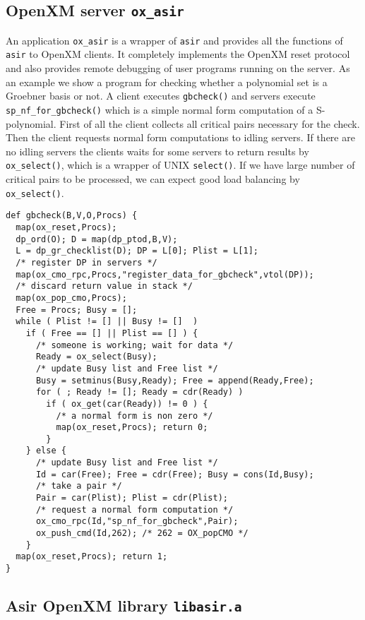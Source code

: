 \documentclass[runningheads]{cl2emult}
\begin{document}
\subsection{OpenXM server {\tt ox\_asir}}

An application {\tt ox\_asir} is a wrapper of {\tt asir} and provides
all the functions of {\tt asir} to OpenXM clients. It completely
implements the OpenXM reset protocol and also provides remote
debugging of user programs running on the server. As an example we
show a program for checking whether a polynomial set is a Groebner
basis or not. A client executes {\tt gbcheck()} and servers execute
{\tt sp\_nf\_for\_gbcheck()} which is a simple normal form computation
of a S-polynomial. First of all the client collects all critical pairs
necessary for the check. Then the client requests normal form
computations to idling servers. If there are no idling servers the
clients waits for some servers to return results by {\tt
ox\_select()}, which is a wrapper of UNIX {\tt select()}. If we have
large number of critical pairs to be processed, we can expect good
load balancing by {\tt ox\_select()}.

\begin{verbatim}
def gbcheck(B,V,O,Procs) {
  map(ox_reset,Procs);
  dp_ord(O); D = map(dp_ptod,B,V);  
  L = dp_gr_checklist(D); DP = L[0]; Plist = L[1];
  /* register DP in servers */
  map(ox_cmo_rpc,Procs,"register_data_for_gbcheck",vtol(DP));
  /* discard return value in stack */
  map(ox_pop_cmo,Procs);
  Free = Procs; Busy = [];
  while ( Plist != [] || Busy != []  )
    if ( Free == [] || Plist == [] ) {
      /* someone is working; wait for data */
      Ready = ox_select(Busy);
	  /* update Busy list and Free list */
      Busy = setminus(Busy,Ready); Free = append(Ready,Free);
      for ( ; Ready != []; Ready = cdr(Ready) )
        if ( ox_get(car(Ready)) != 0 ) {
		  /* a normal form is non zero */
          map(ox_reset,Procs); return 0;
        }
    } else {
	  /* update Busy list and Free list */
      Id = car(Free); Free = cdr(Free); Busy = cons(Id,Busy);
	  /* take a pair */
	  Pair = car(Plist); Plist = cdr(Plist);
	  /* request a normal form computation */
      ox_cmo_rpc(Id,"sp_nf_for_gbcheck",Pair);
      ox_push_cmd(Id,262); /* 262 = OX_popCMO */
    }
  map(ox_reset,Procs); return 1;
}
\end{verbatim}

\subsection{Asir OpenXM library {\tt libasir.a}}
\end{document}
